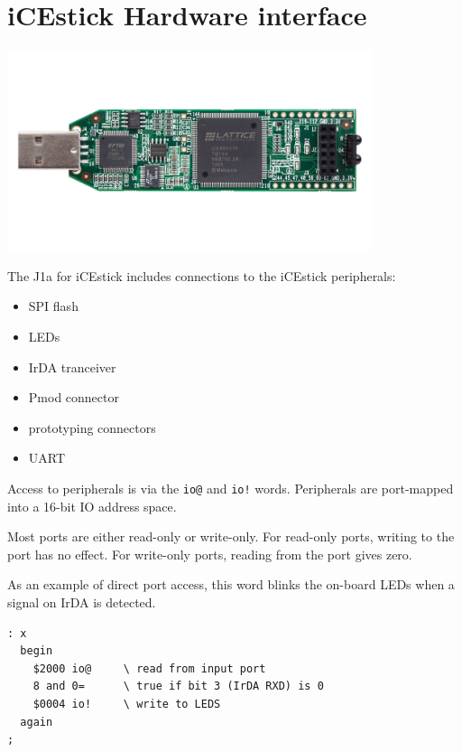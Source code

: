 \documentclass[10pt]{book}
\newcommand{\mach}[1]{\texttt{#1}}
\begin{document}
\chapter{iCEstick Hardware interface}

\begin{center}
\includegraphics[width=0.8\textwidth]{icestick-reva-front-2400.png}
\end{center}

The J1a for iCEstick includes connections to the iCEstick peripherals:
\begin{itemize}
\item SPI flash 
\item LEDs 
\item IrDA tranceiver 
\item Pmod connector 
\item prototyping connectors
\item UART 
\end{itemize}

Access to peripherals is via the
\mach{io@} and \mach{io!} words.
Peripherals are port-mapped into a 16-bit IO address space.

Most ports are either read-only or write-only.
For read-only ports, writing to the port has no effect.
For write-only ports, reading from the port gives zero.

As an example of direct port access, this word
blinks the on-board LEDs when a signal on IrDA is detected. 

\begin{framed}
\begin{Verbatim}
: x
  begin
    $2000 io@     \ read from input port
    8 and 0=      \ true if bit 3 (IrDA RXD) is 0
    $0004 io!     \ write to LEDS
  again
;
\end{Verbatim}
\end{framed}
\end{document}
